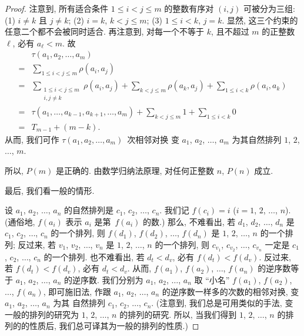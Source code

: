 \documentclass[%
    UTF8,%
    fontset=none,%
    punct=kaiming,%
    zihao=-4,%
    a4paper,%
    oneside,%
]{ctexbook}
\let\emph\relax
\renewcommand*{\leq}{\leqslant}
\begin{document}
\begin{proof}
    注意到, 所有适合条件 \(1 \leq i < j \leq m\)
    的整数有序对 \((i, j)\)
    可被分为三组:
    (1) \(i \neq k\) 且 \(j \neq k\);
    (2) \(i = k\), \(k < j \leq m\);
    (3) \(1 \leq i < k\), \(j = k\).
    显然, 这三个约束的任意二个都不会被同时适合.
    再注意到, 对每一个不等于 \(k\),
    且不超过 \(m\) 的正整数 \(\ell\),
    必有 \(a_\ell < m\).
    故
    \begin{align*}
             & \tau (a_1, a_2, \dots, a_m)
        \\
        = {} &
        \sum_{1 \leq i < j \leq m} {\rho(a_i, a_j)}
        \\
        = {} &
        \sum_{\substack{1 \leq i < j \leq m \\i,j \neq k}}
        {\rho(a_i, a_j)}
        + \sum_{k < j \leq m} {\rho(a_k, a_j)}
        + \sum_{1 \leq i < k} {\rho(a_i, a_k)}
        \\
        = {} &
        \tau (a_1, \dots, a_{k-1}, a_{k+1}, \dots, a_m)
        + \sum_{k < j \leq m} {1}
        + \sum_{1 \leq i < k} {0}
        \\
        = {} &
        T_{m-1} + (m - k).
    \end{align*}
    从而, 我们可作
    \(\tau (a_1, a_2, \dots, a_m)\)~次相邻对换%
    变 \(a_1\), \(a_2\), \(\dots\), \(a_m\)
    为其自然排列 \(1\), \(2\), \(\dots\), \(m\).

    所以, \(P(m)\) 是正确的.
    由数学归纳法原理,
    对任何正整数 \(n\), \(P(n)\) 成立.

    最后, 我们看一般的情形.

    设 \(a_1\), \(a_2\), \(\dots\), \(a_n\)
    的自然排列是 \(c_1\), \(c_2\), \(\dots\), \(c_n\).
    我们记 \(f(c_i) = i\)
    (\(i = 1\), \(2\), \(\dots\), \(n\)).
    (通俗地, \(f(a_i)\) 表示
    \(a_i\) 是第~\(f(a_i)\) \emph{小}的数.)
    那么, 不难看出,
    若 \(d_1\), \(d_2\), \(\dots\), \(d_n\)
    是 \(c_1\), \(c_2\), \(\dots\), \(c_n\)
    的一个排列,
    则 \(f(d_1)\), \(f(d_2)\), \(\dots\), \(f(d_n)\)
    是 \(1\), \(2\), \(\dots\), \(n\)
    的一个排列;
    反过来, 若 \(v_1\), \(v_2\), \(\dots\), \(v_n\) 是
    \(1\), \(2\), \(\dots\), \(n\) 的一个排列,
    则 \(c_{v_1}\), \(c_{v_2}\), \(\dots\), \(c_{v_n}\)
    一定是 \(c_1\), \(c_2\), \(\dots\), \(c_n\) 的一个排列.
    也不难看出, 若 \(d_t < d_v\), 必有 \(f(d_t) < f(d_v)\).
    反过来, 若 \(f(d_t) < f(d_v)\), 必有 \(d_t < d_v\).
    从而, \(f(a_1)\), \(f(a_2)\), \(\dots\), \(f(a_n)\)
    的逆序数等于 \(a_1\), \(a_2\), \(\dots\), \(a_n\)
    的逆序数.
    我们分别为 \(a_1\), \(a_2\), \(\dots\), \(a_n\)
    取 ``小名'' \(f(a_1)\), \(f(a_2)\), \(\dots\), \(f(a_n)\),
    即可施旧法, 作跟 \(a_1\), \(a_2\), \(\dots\), \(a_n\)
    的逆序数一样多的次数的相邻对换,
    变 \(a_1\), \(a_2\), \(\dots\), \(a_n\) 为其%
    自然排列 \(c_1\), \(c_2\), \(\dots\), \(c_n\).
    (注意到, 我们总是可用类似的手法,
    变一般的排列的研究为
    \(1\), \(2\), \(\dots\), \(n\) 的排列的研究.
    所以, 当我们得到
    \(1\), \(2\), \(\dots\), \(n\)
    的排列的\emph{只跟逆序有关}的性质后,
    我们总可译其为一般的排列的性质.)
\end{proof}
\end{document}
